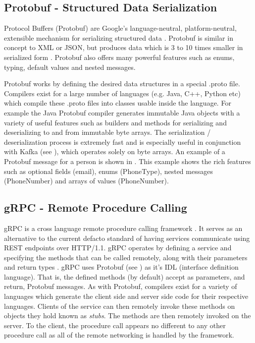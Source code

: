 \subsection{Protobuf - Structured Data Serialization}\label{sec:protobuf}
Protocol Buffers (Protobuf) are Google's language-neutral, platform-neutral, extensible mechanism for serializing structured data \cite{protobuf}. Protobuf is similar in concept to XML or JSON, but produces data which is 3 to 10 times smaller in serialized form \cite{protobufSizeStat}. Protobuf also offers many powerful features such as enums, typing, default values and nested messages.

Protobuf works by defining the desired data structures in a special .proto file. Compilers exist for a large number of languages (e.g. Java, C++, Python etc) which compile these .proto files into classes usable inside the language. For example the Java Protobuf compiler generates immutable Java objects with a variety of useful features such as builders and methods for serializing and deserializing to and from immutable byte arrays. The serialization / deserialization process is extremely fast and is especially useful in conjunction with Kafka (see ), which operates solely on byte arrays. An example of a Protobuf message for a person is shown in . This example shows the rich features such as optional fields (email), enums (PhoneType), nested messages (PhoneNumber) and arrays of values (PhoneNumber).



\subsection{gRPC - Remote Procedure Calling}
gRPC is a cross language remote procedure calling framework \cite{gRPC}. It serves as an alternative to the current defacto standard of having services communicate using REST endpoints over HTTP/1.1. gRPC operates by defining a service and specifying the methods that can be called remotely, along with their parameters and return types \cite{gRPCDef}. gRPC uses Protobuf (see ) as it's IDL (interface definition language). That is, the defined methods (by default) accept as parameters, and return, Protobuf messages. As with Protobuf, compilers exist for a variety of languages which generate the client side and server side code for their respective languages. Clients of the service can then remotely invoke these methods on objects they hold known as \textit{stubs}. The methods are then remotely invoked on the server. To the client, the procedure call appears no different to any other procedure call as all of the remote networking is handled by the framework. 

